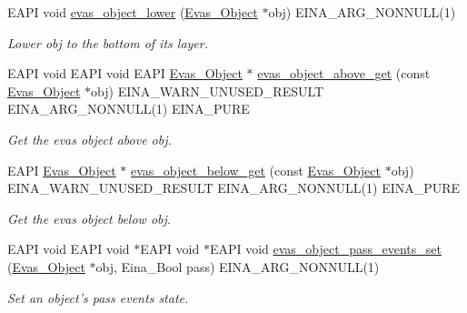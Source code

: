 \begin{DoxyCompactItemize}
EAPI void \hyperlink{group__Evas__Object__Group__Basic_gae5ede5671799a140e3d3f7bb7ea7f14f}{evas\_\-object\_\-lower} (\hyperlink{group__Evas__Object__Group_ga9e19e6dd1f517a0ba437c0114d3e7c97}{Evas\_\-Object} $\ast$obj) EINA\_\-ARG\_\-NONNULL(1)
\begin{DoxyCompactList}\small\item\em Lower {\ttfamily obj} to the bottom of its layer. \item\end{DoxyCompactList}\item 
EAPI void EAPI void EAPI \hyperlink{group__Evas__Object__Group_ga9e19e6dd1f517a0ba437c0114d3e7c97}{Evas\_\-Object} $\ast$ \hyperlink{group__Evas__Object__Group__Basic_gab78867a46ecc2e35ac90bf40bae1689f}{evas\_\-object\_\-above\_\-get} (const \hyperlink{group__Evas__Object__Group_ga9e19e6dd1f517a0ba437c0114d3e7c97}{Evas\_\-Object} $\ast$obj) EINA\_\-WARN\_\-UNUSED\_\-RESULT EINA\_\-ARG\_\-NONNULL(1) EINA\_\-PURE
\begin{DoxyCompactList}\small\item\em Get the evas object above {\ttfamily obj}. \item\end{DoxyCompactList}\item 
EAPI \hyperlink{group__Evas__Object__Group_ga9e19e6dd1f517a0ba437c0114d3e7c97}{Evas\_\-Object} $\ast$ \hyperlink{group__Evas__Object__Group__Basic_gaff15b0dacac065bc84e6124c0c4920c5}{evas\_\-object\_\-below\_\-get} (const \hyperlink{group__Evas__Object__Group_ga9e19e6dd1f517a0ba437c0114d3e7c97}{Evas\_\-Object} $\ast$obj) EINA\_\-WARN\_\-UNUSED\_\-RESULT EINA\_\-ARG\_\-NONNULL(1) EINA\_\-PURE
\begin{DoxyCompactList}\small\item\em Get the evas object below {\ttfamily obj}. \item\end{DoxyCompactList}\item 
EAPI void EAPI void $\ast$EAPI void $\ast$EAPI void \hyperlink{group__Evas__Object__Group__Events_ga5622d84abe1bd303de71f8ddbdcd0665}{evas\_\-object\_\-pass\_\-events\_\-set} (\hyperlink{group__Evas__Object__Group_ga9e19e6dd1f517a0ba437c0114d3e7c97}{Evas\_\-Object} $\ast$obj, Eina\_\-Bool pass) EINA\_\-ARG\_\-NONNULL(1)
\begin{DoxyCompactList}\small\item\em Set an object's pass events state. \item\end{DoxyCompactList}\item 

\end{DoxyCompactItemize}
